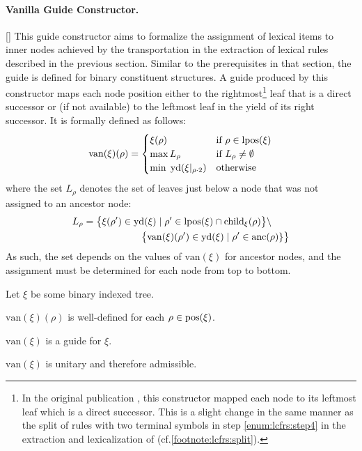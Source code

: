 \documentclass[../../document.tex]{subfiles}
\begin{document}
    \paragraph{Vanilla Guide Constructor.}[]
    This guide constructor aims to formalize the assignment of lexical items to inner nodes achieved by the transportation in the extraction of lexical  rules described in the previous section.
    Similar to the prerequisites in that section, the guide is defined for binary constituent structures.
    A guide produced by this constructor maps each node position either to the rightmost\footnote{
        In the original publication \citep{Rup22}, this constructor mapped each node to its leftmost leaf which is a direct successor.
        This is a slight change in the same manner as the split of rules with two terminal symbols in step \ref{enum:lcfrs:step4} in the extraction and lexicalization of  (cf.\@ \cref{footnote:lcfrs:split}).
    } leaf that is a direct successor or (if not available) to the leftmost leaf in the yield of its right successor.
    It is formally defined as follows:
    \[
    \mathrm{van}(\xi)(\rho) = \begin{cases}
        \xi(\rho)   & \text{if $\rho \in \operatorname{lpos}(\xi)$}\\
        \max L_\rho & \text{if $L_\rho \neq \emptyset$} \\
        \min\;\operatorname{yd}(\xi|_{\rho\cdot 2}) &\text{otherwise}
    \end{cases}
    \]
    where the set \(L_\rho\) denotes the set of leaves just below a node that was not assigned to an ancestor node:
    \begin{align*}
        L_\rho &= \big\{\xi(\rho') \in \operatorname{yd}(\xi) \mid \rho' \in \operatorname{lpos}(\xi) \cap \operatorname{child}_\xi(\rho) \big\} \setminus \\
        &\qquad\qquad\qquad  \big\{\mathrm{van}(\xi)(\rho') \in \operatorname{yd}(\xi) \mid \rho' \in \operatorname{anc}(\rho)\} \big\}
    \end{align*}
    As such, the set depends on the values of \(\mathrm{van}(\xi)\) for ancestor nodes, and the assignment must be determined for each node from top to bottom.

    \begin{theorem}
        Let \(\xi\) be some binary indexed tree.
        \begin{compactenum}
            \item \(\mathrm{van}(\xi)(\rho)\) is well-defined for each \(\rho \in \operatorname{pos}(\xi)\).
            \item \(\mathrm{van}(\xi)\) is a guide for \(\xi\).
            \item \(\mathrm{van}(\xi)\) is unitary and therefore admissible.
        \end{compactenum}
    \end{theorem}
\end{document}
